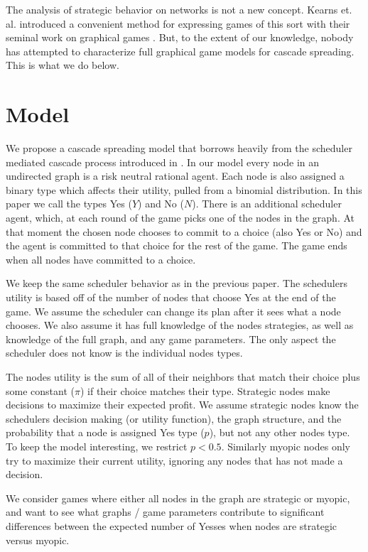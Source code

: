 \documentclass{article}
\begin{document}
The analysis of strategic behavior on networks is not a new
concept. Kearns et. al.  introduced a convenient method for expressing
games of this sort with their seminal work on graphical games
\cite{Kearns01}. But, to the extent of our knowledge, nobody has
attempted to characterize full graphical game models for cascade
spreading.  This is what we do below.


\section{Model}
\label{prob_statement}

We propose a cascade spreading model that borrows heavily from the
scheduler mediated cascade process introduced in
\cite{Chierichetti12}. In our model every node in an undirected graph
is a risk neutral rational agent. Each node is also assigned a binary
type which affects their utility, pulled from a binomial
distribution. In this paper we call the types Yes ($Y$) and No
($N$). There is an additional scheduler agent, which, at each round of
the game picks one of the nodes in the graph. At that moment the
chosen node chooses to commit to a choice (also Yes or No) and the
agent is committed to that choice for the rest of the game. The game
ends when all nodes have committed to a choice.

We keep the same scheduler behavior as in the previous paper. The
schedulers utility is based off of the number of nodes that choose Yes
at the end of the game. We assume the scheduler can change its plan
after it sees what a node chooses. We also assume it has full
knowledge of the nodes strategies, as well as knowledge of the full
graph, and any game parameters. The only aspect the scheduler does not
know is the individual nodes types.

The nodes utility is the sum of all of their neighbors that match
their choice plus some constant ($\pi$) if their choice matches their
type. Strategic nodes make decisions to maximize their expected
profit. We assume strategic nodes know the schedulers decision making
(or utility function), the graph structure, and the probability that a
node is assigned Yes type ($p$), but not any other nodes type. To keep
the model interesting, we restrict $p < 0.5$. Similarly myopic nodes
only try to maximize their current utility, ignoring any nodes that
has not made a decision.

We consider games where either all nodes in the graph are strategic or
myopic, and want to see what graphs / game parameters contribute to
significant differences between the expected number of Yesses when
nodes are strategic versus myopic.
\end{document}
